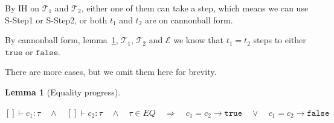 \documentclass[a4paper]{article}
\newcommand{\s}[1]{\mathtt{#1}}
\newcommand{\strue}{\s{true}}
\newcommand{\sfalse}{\s{false}}
\newcommand{\im}{\Rightarrow}
\newcommand{\step}{\to}
\newcommand{\patbind}{\Rightarrow^{pat}}
\newcommand{\angled}[1]{\langle #1\rangle}
\newcommand{\T}{\mathcal{T}}
\newcommand{\E}{\mathcal{E}}
\newcommand{\stackover}[2]{\stackrel{{#2}}{#1}}
\renewcommand{\rule}[3][]{\ \mbox{\textsc{#1 }}\dfrac{#2}{#3}\ }
\newtheorem{lemma}{Lemma}[section]
\begin{document}
\begin{itemize}
By IH on $\T_1$ and $\T_2$, either one of them can take a step,
which means we can use S-Step1 or S-Step2, or both $t_1$ and $t_2$
are on cannonball form.

By cannonball form, lemma~\ref{lemma:equalityProgress}, $\T_1$,
$\T_2$ and $\E$ we know that $t_1 = t_2$ steps to either $\strue$
or $\sfalse$.



\end{itemize}

There are more cases, but
we omit them
here for brevity.




\begin{lemma}[Equality progress] $ $
  \label{lemma:equalityProgress}

$[]\vdash c_1:\tau \quad \land \quad []\vdash c_2:\tau \quad \land \quad \tau \in EQ \quad \im \quad
c_1 = c_2 \step \strue \quad \lor \quad c_1 = c_2 \step \sfalse$
\end{lemma}
\end{document}
